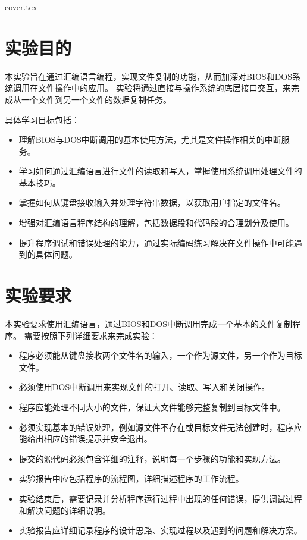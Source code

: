 \documentclass[12pt]{article}
\begin{document}
 {cover.tex}
\section{实验目的}
本实验旨在通过汇编语言编程，实现文件复制的功能，从而加深对BIOS和DOS系统调用在文件操作中的应用。
实验将通过直接与操作系统的底层接口交互，来完成从一个文件到另一个文件的数据复制任务。

具体学习目标包括：
\begin{itemize}
    \item 理解BIOS与DOS中断调用的基本使用方法，尤其是文件操作相关的中断服务。
    \item 学习如何通过汇编语言进行文件的读取和写入，掌握使用系统调用处理文件的基本技巧。
    \item 掌握如何从键盘接收输入并处理字符串数据，以获取用户指定的文件名。
    \item 增强对汇编语言程序结构的理解，包括数据段和代码段的合理划分及使用。
    \item 提升程序调试和错误处理的能力，通过实际编码练习解决在文件操作中可能遇到的具体问题。
\end{itemize}

\section{实验要求}
本实验要求使用汇编语言，通过BIOS和DOS中断调用完成一个基本的文件复制程序。
需要按照下列详细要求来完成实验：

\begin{itemize}
    \item 程序必须能从键盘接收两个文件名的输入，一个作为源文件，另一个作为目标文件。
    \item 必须使用DOS中断调用来实现文件的打开、读取、写入和关闭操作。
    \item 程序应能处理不同大小的文件，保证大文件能够完整复制到目标文件中。
    \item 必须实现基本的错误处理，例如源文件不存在或目标文件无法创建时，程序应能给出相应的错误提示并安全退出。
    \item 提交的源代码必须包含详细的注释，说明每一个步骤的功能和实现方法。
    \item 实验报告中应包括程序的流程图，详细描述程序的工作流程。
    \item 实验结束后，需要记录并分析程序运行过程中出现的任何错误，提供调试过程和解决问题的详细说明。
    \item 实验报告应详细记录程序的设计思路、实现过程以及遇到的问题和解决方案。
\end{itemize}
\end{document}

